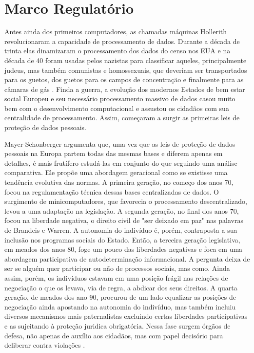 \section{Marco Regulatório}
\label{sec:marco-regulatorio}

Antes ainda dos primeiros computadores, as chamadas máquinas Hollerith revolucionaram a capacidade de processamento de dados.
Durante a década de trinta elas dinamizaram o processamento dos dados do censo nos EUA e na década de 40 foram usadas pelos nazistas para classificar aqueles, principalmente judeus, mas também comunistas e homossexuais, que deveriam ser transportados para os guetos, dos guetos para os campos de concentração e finalmente para as câmaras de gás \cite{Black01}.
Finda a guerra, a evolução dos modernos Estados de bem estar social Europeu e seu necessário processamento massivo de dados casou muito bem com o desenvolvimento computacional e assustou os cidadãos com sua centralidade de processamento.
Assim, começaram a surgir as primeiras leis de proteção de dados pessoais.

Mayer-Schonberger argumenta que, uma vez que as leis de proteção de dados pessoais na Europa partem todas das mesmas bases e diferem apenas em detalhes, é mais frutífero estudá-las em conjunto do que seguindo uma análise comparativa.
Ele propõe uma abordagem geracional como se existisse uma tendência evolutiva das normas.
A primeira geração, no começo dos anos 70, focou na regulamentação técnica dessas bases centralizadas de dados.
O surgimento de minicomputadores, que favorecia o processamento descentralizado, levou a uma adaptação na legislação.
A segunda geração, no final dos anos 70, focou na liberdade negativa, o direito civil de "ser deixado em paz" nas palavras de Brandeis e Warren.
A autonomia do indivíduo é, porém, contraposta a sua inclusão nos programas sociais do Estado.
Então, a terceira geração legislativa, em meados dos anos 80, foge um pouco das liberdades negativas e foca em uma abordagem participativa de autodeterminação informacional.
A pergunta deixa de ser se alguém quer participar ou não de processos sociais, mas como.
Ainda assim, porém, os indivíduos estavam em uma posição frágil nas relações de negociação o que os levava, via de regra, a abdicar dos seus direitos.
A quarta geração, de meados dos ano 90, procurou de um lado equalizar as posições de negociação ainda apostando na autonomia do indivíduo, mas também incluiu diversos mecanismos mais paternalistas excluindo certas liberdades participativas e as sujeitando à proteção juridica obrigatória.
Nessa fase surgem órgãos de defesa, não apenas de auxílio aos cidadãos, mas com papel decisório para deliberar contra violações \cite{Mayer-Schonberger97}.


